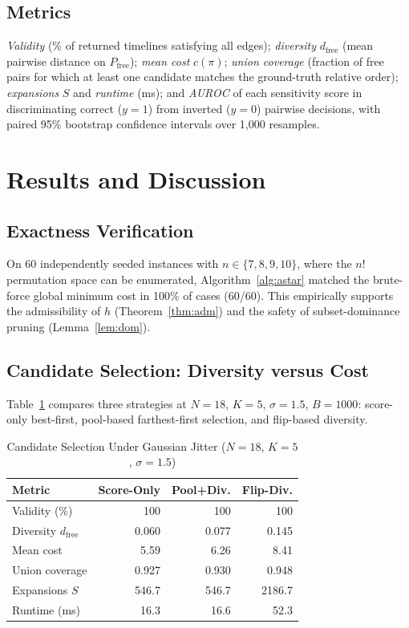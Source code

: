 \documentclass{ieeeaccess}
\newcommand{\Pfree}{P_{\mathrm{free}}}
\newcommand{\dfree}{d_{\mathrm{free}}}
\begin{document}
\subsection{Metrics}
\emph{Validity} (\% of returned timelines satisfying all edges); \emph{diversity} $\dfree$ (mean pairwise distance on $\Pfree$); \emph{mean cost} $c(\pi)$; \emph{union coverage} (fraction of free pairs for which at least one candidate matches the ground-truth relative order); \emph{expansions} $S$ and \emph{runtime} (ms); and \emph{AUROC} of each sensitivity score in discriminating correct ($y=1$) from inverted ($y=0$) pairwise decisions, with paired 95\% bootstrap confidence intervals over 1{,}000 resamples.

\section{Results and Discussion}\label{sec:results}

\subsection{Exactness Verification}
On 60 independently seeded instances with $n\in\{7,8,9,10\}$, where the $n!$ permutation space can be enumerated, Algorithm~\ref{alg:astar} matched the brute-force global minimum cost in 100\% of cases (60/60). This empirically supports the admissibility of $h$ (Theorem~\ref{thm:adm}) and the safety of subset-dominance pruning (Lemma~\ref{lem:dom}).

\subsection{Candidate Selection: Diversity versus Cost}
Table~\ref{tab:select} compares three strategies at $N=18$, $K=5$, $\sigma=1.5$, $B=1000$: score-only best-first, pool-based farthest-first selection, and flip-based diversity.

\begin{table}[!t]
\caption{Candidate Selection Under Gaussian Jitter ($N=18$, $K=5$, $\sigma=1.5$)}
\label{tab:select}
\centering
\footnotesize
\setlength{\tabcolsep}{3.5pt}
\renewcommand{\arraystretch}{1.1}
\begin{tabular}{@{}lrrr@{}}
\toprule
\textbf{Metric} & \textbf{Score-Only} & \textbf{Pool+Div.} & \textbf{Flip-Div.}\\
\midrule
Validity (\%) & 100 & 100 & 100\\
Diversity $\dfree$ & 0.060 & 0.077 & 0.145\\
Mean cost & 5.59 & 6.26 & 8.41\\
Union coverage & 0.927 & 0.930 & 0.948\\
Expansions $S$ & 546.7 & 546.7 & 2186.7\\
Runtime (ms) & 16.3 & 16.6 & 52.3\\
\bottomrule
\end{tabular}
\end{table}
\end{document}
